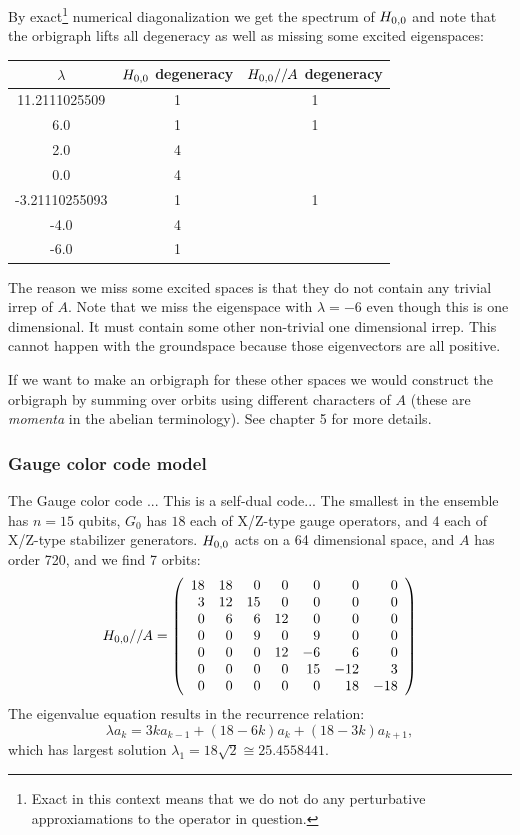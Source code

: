 \documentclass[12pt]{article}
\begin{document}
By exact\footnote{Exact in this context means that we do not do any
perturbative approxiamations to the operator in question.}
numerical diagonalization
we get the spectrum of $H_{0,0}$ and note that the orbigraph lifts
all degeneracy as well as missing some excited eigenspaces:
\begin{center}
\begin{tabular}{ c|c|c } 
$\lambda$ & $H_{0,0}$ degeneracy & $H_{0,0}//A$ degeneracy \\
\hline
    11.2111025509 & 1 & 1 \\
    6.0 & 1 & 1 \\
    2.0 & 4 &   \\
    0.0 & 4 &   \\
    -3.21110255093 & 1 & 1 \\
    -4.0 & 4 &   \\
    -6.0 & 1 &   
\end{tabular}
\end{center}
The reason we miss some excited spaces is that they do not contain
any trivial irrep of $A.$
Note that we miss the eigenspace with $\lambda = -6$
even though this is one dimensional. It must contain some other non-trivial
one dimensional irrep. This cannot happen with the groundspace because
those eigenvectors are all positive.

If we want to make an orbigraph for these other spaces we would construct
the orbigraph by
summing over orbits using different characters of $A$
(these are \emph{momenta} in the abelian terminology).
See \cite{Cvetkovic1980} chapter 5 for more details.

%
\subsubsection{Gauge color code model}
The Gauge color code \cite{Bombin2015,Bombin2015single}...
This is a self-dual code...
The smallest in the ensemble has $n=15$ qubits,
$G_0$ has $18$ each of X/Z-type gauge operators,
and $4$ each of X/Z-type stabilizer generators.
$H_{0,0}$ acts on a 64 dimensional space, and $A$ has
order 720, and we find 7 orbits:
$$
H_{0,0}//A = 
\left(\begin{array}{rrrrrrr}
18 & 18 &  0 &  0 &  0 &  0 &  0 \cr
  3 & 12 & 15 &  0 &  0 &  0 &  0 \cr
  0 &  6 &  6 & 12 &  0 &  0 &  0 \cr
  0 &  0 &  9 &  0 &  9 &  0 &  0 \cr
  0 &  0 &  0 & 12 & -6 &  6 &  0 \cr
  0 &  0 &  0 &  0 & 15 & -12 &  3 \cr
  0 &  0 &  0 &  0 &  0 & 18 & -18
\end{array}\right)
$$
The eigenvalue equation results in
the recurrence relation:
$$
    \lambda a_k = 3ka_{k-1} + (18-6k)a_k + (18-3k)a_{k+1},
$$
which has largest solution 
$\lambda_1 = 18\sqrt{2} \cong 25.4558441.$
\end{document}
